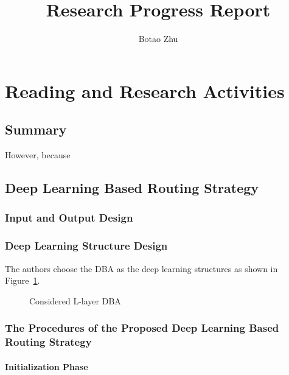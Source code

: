 \documentclass[11pt]{report}
\title{Research Progress Report}
\author{Botao Zhu}
\begin{document}
	
	\maketitle
	 \chead{} 
	 \cfoot{} 
	\renewcommand{\footrulewidth}{1.0pt}
	\renewcommand{\headrulewidth}{2.0pt}
	\renewcommand{\arraystretch}{1.3}
	\pagestyle{fancy}
	
	\renewcommand{\thesection}{\arabic{section}}
	
	\section{Reading and Research Activities}
	
	\subsection{Summary}
	
	\noindent\cite{5408367} 

	
	\noindent However, because
	
	\subsection{Deep Learning Based Routing Strategy}
	\subsubsection{Input and Output Design}
	
	\subsubsection{Deep Learning Structure Design}
	The authors choose the DBA as the deep learning structures as shown in Figure~\ref{1stfig}.
	\begin{figure}[h!]
		\centering
		\caption{Considered L-layer DBA}
		\label{1stfig}
	\end{figure}
	
	\subsubsection{The Procedures of the Proposed Deep Learning Based Routing Strategy}
	\paragraph{Initialization Phase}
\end{document}
